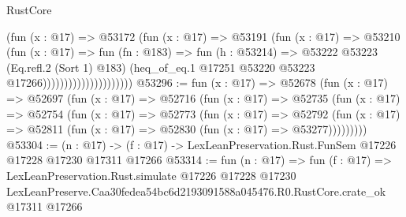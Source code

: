 \begin{lexlean}{RustCore}
\begin{coremodule}
                                    (fun (x : @17) =>
                                    @53172
                                      (fun (x : @17) =>
                                      @53191
                                        (fun (x : @17) =>
                                        @53210
                                          (fun (x : @17) =>
                                          fun (fn : @183) =>
                                          fun (h : @53214) =>
                                          @53222
                                            @53223
                                            (Eq.refl.{2} (Sort 1) @183)
                                            (heq_of_eq.{1}
                                              @17251
                                              @53220
                                              @53223
                                              @17266)))))))))))))))))))))
@53296 := fun (x : @17) =>
  @52678
    (fun (x : @17) =>
    @52697
      (fun (x : @17) =>
      @52716
        (fun (x : @17) =>
        @52735
          (fun (x : @17) =>
          @52754
            (fun (x : @17) =>
            @52773
              (fun (x : @17) =>
              @52792
                (fun (x : @17) => @52811 (fun (x : @17) => @52830 (fun (x : @17) => @53277)))))))))
@53304 := (n : @17) ->
  (f : @17) -> LexLeanPreservation.Rust.FunSem @17226 @17228 @17230 @17311 @17266
@53314 := fun (n : @17) =>
  fun (f : @17) =>
  LexLeanPreservation.Rust.simulate
    @17226
    @17228
    @17230
    LexLeanPreserve.Caa30fedea54bc6d2193091588a045476.R0.RustCore.crate_ok
    @17311
    @17266
\end{coremodule}
\end{lexlean}
